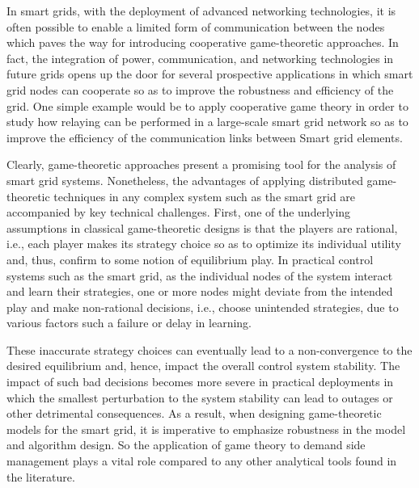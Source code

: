 \documentclass[12pt,twoside]{article}
\begin{document}
In smart grids, with the deployment of advanced networking technologies, it is often possible to enable a limited form of communication between the nodes which paves the way for introducing cooperative game-theoretic approaches. In fact, the integration of power, communication, and networking technologies in future grids opens up the door for several prospective applications in which smart grid nodes can cooperate so as to improve the robustness and efficiency of the grid. One simple example would be to apply cooperative game theory in order to study how relaying can be performed in a large-scale smart grid network so as to improve the efficiency of the communication links between
Smart grid elements.

Clearly, game-theoretic approaches present a promising tool for the analysis of smart grid systems. Nonetheless, the advantages of applying distributed game-theoretic techniques in any complex system such as the smart grid are accompanied by key technical challenges. First, one of the underlying assumptions in classical game-theoretic designs is that the players are rational, i.e., each player makes its strategy choice so as to optimize its individual utility and, thus, confirm to some notion of equilibrium play. In practical control systems such as the smart grid, as the individual nodes of the system interact and learn their strategies, one or more nodes might deviate from the intended play and make non-rational decisions, i.e., choose unintended strategies, due to various factors such a failure or delay in learning.

These inaccurate strategy choices can eventually lead to a non-convergence to the desired equilibrium and, hence, impact the overall control system stability. The impact of such bad decisions becomes more severe in practical deployments in which the smallest perturbation to the system stability can lead to outages or other detrimental consequences. As a result, when designing game-theoretic models for the smart grid, it is imperative to emphasize robustness in the model and algorithm design.
So the application of game theory to demand side management plays a vital role compared to any other analytical tools found in the literature.
\end{document}
